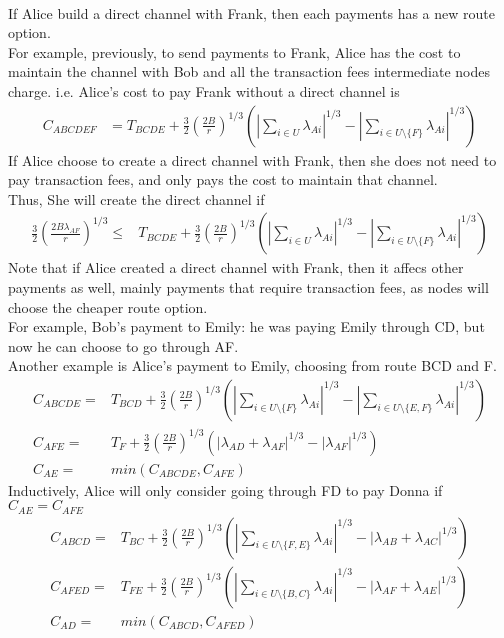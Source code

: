 \documentclass[12pt]{article}
\theoremstyle{plain}
\theoremstyle{remark}
\theoremstyle{definition}
\renewcommand{\leq}{\leqslant}
\renewcommand{\leq}{\leqslant}
\begin{document}
\\ If Alice build a direct channel with Frank, then each payments has a new route option. 
\\ For example, previously, to send payments to Frank, Alice has the cost to maintain the channel with Bob and all the transaction fees intermediate nodes charge. i.e. Alice's cost to pay Frank without a direct channel is \begin{align}
  C_{ABCDEF} &= T_{BCDE}+ \frac{3}{2}(\frac{2B}{r})^{1/3}(|\sum_{i\in U}\lambda_{Ai}|^{1/3}-|\sum_{i\in U\setminus\{F\}}\lambda_{Ai}|^{1/3})
\end{align}
If Alice choose to create a direct channel with Frank, then she does not need to pay transaction fees, and only pays the cost to maintain that channel.
\\ Thus, She will create the direct channel if 
\begin{align}
  \frac{3}{2}(\frac{2B\lambda_{AF}}{r})^{1/3}\leq &T_{BCDE}+\frac{3}{2}(\frac{2B}{r})^{1/3}(|\sum_{i\in U}\lambda_{Ai}|^{1/3}-|\sum_{i\in U\setminus\{F\}}\lambda_{Ai}|^{1/3})
\end{align}
Note that if Alice created a direct channel with Frank, then it affecs other payments as well,  mainly payments that require transaction fees, as nodes will choose the cheaper route option. 
\\ For example, Bob's payment to Emily: he was paying Emily through CD, but now he can choose to go through AF.
\\ Another example is Alice's payment to Emily, choosing from route BCD and F. 
\begin{align}
  C_{ABCDE} = &T_{BCD}+ \frac{3}{2}(\frac{2B}{r})^{1/3}(|\sum_{i\in U\setminus\{F\}}\lambda_{Ai}|^{1/3}-|\sum_{i\in U\setminus\{E,F\}}\lambda_{Ai}|^{1/3})\\
  C_{AFE} = &T_{F}+ \frac{3}{2}(\frac{2B}{r})^{1/3}(|\lambda_{AD}+\lambda_{AF}|^{1/3}-|\lambda_{AF}|^{1/3})\\
  C_{AE} =& min(C_{ABCDE},C_{AFE})
\end{align}
Inductively, Alice will only consider going through FD to pay Donna if $C_{AE}=C_{AFE}$
\begin{align}
  C_{ABCD} = &T_{BC}+ \frac{3}{2}(\frac{2B}{r})^{1/3}(|\sum_{i\in U\setminus\{F,E\}}\lambda_{Ai}|^{1/3}-|\lambda_{AB}+\lambda_{AC}|^{1/3})\\
  C_{AFED} = &T_{FE}+ \frac{3}{2}(\frac{2B}{r})^{1/3}(|\sum_{i\in U\setminus\{B,C\}}\lambda_{Ai}|^{1/3}-|\lambda_{AF}+\lambda_{AE}|^{1/3})\\
  C_{AD} =& min(C_{ABCD},C_{AFED})
\end{align}
\end{document}
